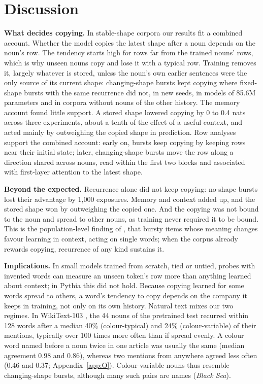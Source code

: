 \documentclass[11pt]{article}
\begin{document}
\section{Discussion}\label{sec:discussion}
\textbf{What decides copying.} In stable-shape corpora our results fit a combined account. Whether the model copies the latest shape after a noun depends on the noun's row. The tendency starts high for rows far from the trained nouns' rows, which is why unseen nouns copy and lose it with a typical row. Training removes it, largely whatever is stored, unless the noun's own earlier sentences were the only source of its current shape: changing-shape bursts kept copying where fixed-shape bursts with the same recurrence did not, in new seeds, in models of 85.6M parameters and in corpora without nouns of the other history. The memory account found little support. A stored shape lowered copying by 0 to 0.4 nats across three experiments, about a tenth of the effect of a useful context, and acted mainly by outweighing the copied shape in prediction. Row analyses support the combined account: early on, bursts keep copying by keeping rows near their initial state; later, changing-shape bursts move the row along a direction shared across nouns, read within the first two blocks and associated with first-layer attention to the latest shape.

\textbf{Beyond the expected.} Recurrence alone did not keep copying: no-shape bursts lost their advantage by 1,000 exposures. Memory and context added up, and the stored shape won by outweighing the copied one. And the copying was not bound to the noun and spread to other nouns, as training never required it to be bound. This is the population-level finding of \citet{chan2022}, that bursty items whose meaning changes favour learning in context, acting on single words; when the corpus already rewards copying, recurrence of any kind sustains it.

\textbf{Implications.} In small models trained from scratch, tied or untied, probes with invented words can measure an unseen token's row more than anything learned about context; in Pythia this did not hold. Because copying learned for some words spread to others, a word's tendency to copy depends on the company it keeps in training, not only on its own history. Natural text mixes our two regimes. In WikiText-103 \citep{merity2017}, the 44 nouns of the pretrained test recurred within 128 words after a median 40\% (colour-typical) and 24\% (colour-variable) of their mentions, typically over 100 times more often than if spread evenly. A colour word named before a noun twice in one article was usually the same (median agreement 0.98 and 0.86), whereas two mentions from anywhere agreed less often (0.46 and 0.37; Appendix~\ref{app:O}). Colour-variable nouns thus resemble changing-shape bursts, although many such pairs are names (\emph{Black Sea}).
\end{document}
